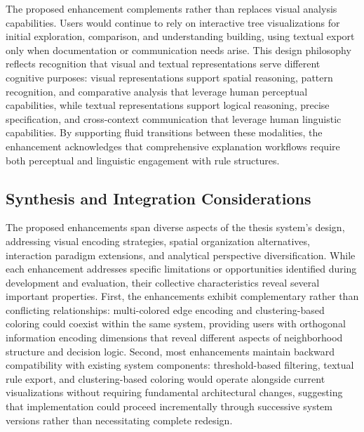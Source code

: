 The proposed enhancement complements rather than replaces visual analysis capabilities. Users would continue to rely on interactive tree visualizations for initial exploration, comparison, and understanding building, using textual export only when documentation or communication needs arise. This design philosophy reflects recognition that visual and textual representations serve different cognitive purposes: visual representations support spatial reasoning, pattern recognition, and comparative analysis that leverage human perceptual capabilities, while textual representations support logical reasoning, precise specification, and cross-context communication that leverage human linguistic capabilities. By supporting fluid transitions between these modalities, the enhancement acknowledges that comprehensive explanation workflows require both perceptual and linguistic engagement with rule structures.

\subsection{Synthesis and Integration Considerations}

The proposed enhancements span diverse aspects of the thesis system's design, addressing visual encoding strategies, spatial organization alternatives, interaction paradigm extensions, and analytical perspective diversification. While each enhancement addresses specific limitations or opportunities identified during development and evaluation, their collective characteristics reveal several important properties. First, the enhancements exhibit complementary rather than conflicting relationships: multi-colored edge encoding and clustering-based coloring could coexist within the same system, providing users with orthogonal information encoding dimensions that reveal different aspects of neighborhood structure and decision logic. Second, most enhancements maintain backward compatibility with existing system components: threshold-based filtering, textual rule export, and clustering-based coloring would operate alongside current visualizations without requiring fundamental architectural changes, suggesting that implementation could proceed incrementally through successive system versions rather than necessitating complete redesign.

